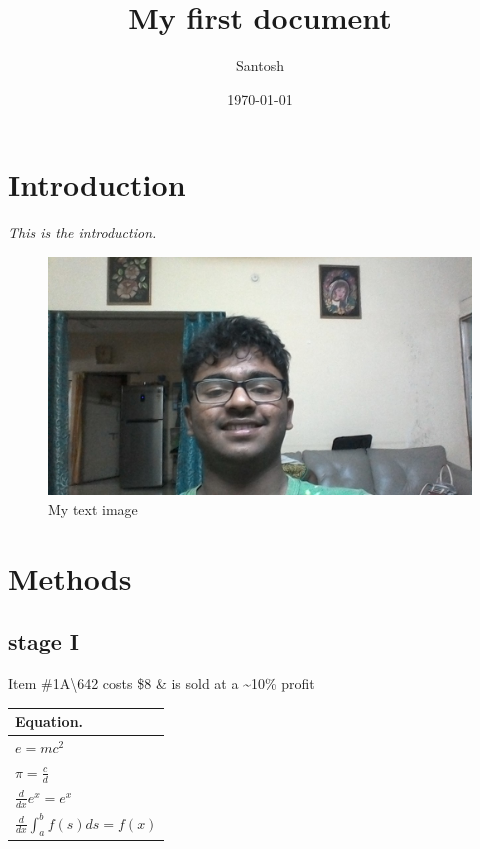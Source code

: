 \documentclass[a4paper,12pt]{article}
\begin{document}
\title{My first document}
\author{Santosh}
\date{\today}
\maketitle

\pagebreak
{}

\tableofcontents
\newpage
{}

\section{Introduction}
\label{stage !}
{\color{yellow}\textit{\huge{{This is the introduction.}}}}
\begin{figure}[p!]
\centering
\includegraphics[width=1\textwidth]{hello}
\caption{My text image}
\end{figure}
\pagebreak

\newpage

\section{Methods}

\subsection{stage I}
Item \#1A\textbackslash642 costs \$8 \& is sold at a \~{}10\% profit

{}


\begin{tabular}{|l|}
\hline
Equation.\\
\hline
$e=mc^2$\\
\hline
$\pi=\frac{c}{d}$\\
\hline
$\frac{d}{dx}e^x=e^x$\\
\hline
$\frac{d}{dx}\int_a^b f(s)ds=f(x)$\\
\hline
\end{tabular}
\end{document}
